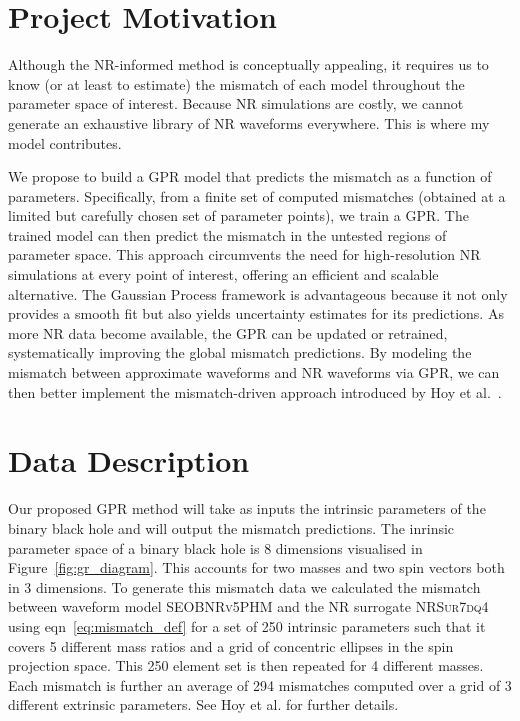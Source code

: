 \documentclass{ucdgradtaughtthesis}
\begin{document}
\section{Project Motivation}
Although the NR-informed method is conceptually appealing, it requires us to know (or at least to estimate) 
the mismatch of each model throughout the parameter space of interest. Because
NR simulations are costly, we cannot generate an exhaustive library of NR waveforms
everywhere. This is where my model contributes.
%

We propose to build a GPR model that predicts the mismatch as a function of parameters. Specifically, from a finite set of computed mismatches (obtained at a limited but carefully chosen set of parameter points), we train a GPR.
The trained model can then predict the mismatch in the untested regions of parameter space. This approach circumvents the need for high-resolution NR simulations at every point of interest,
offering an efficient and scalable alternative. The Gaussian Process framework is advantageous because it not only provides a smooth fit but also yields uncertainty estimates for its predictions.
As more NR data become available, the GPR can be updated or retrained, systematically improving the global mismatch predictions.
By modeling the mismatch between approximate waveforms and NR waveforms via GPR, we can then better implement the mismatch-driven approach introduced by Hoy et al.~\cite{Ogpaper}. 

\section{Data Description}
\label{sec:data_description}
Our proposed GPR method will take as inputs the intrinsic parameters of the binary black hole and will output the mismatch predictions.
The inrinsic parameter space of a binary black hole is 8 dimensions visualised in Figure~\ref{fig:gr_diagram}. This accounts for two masses and two spin vectors both in 3 dimensions. 
To generate this mismatch data we calculated the mismatch between waveform model \textsc{SEOBNRv5PHM} \cite{bestNRfitS} and the NR surrogate \textsc{NRSur7dq4} \cite{NRsurrogate} using eqn~\eqref{eq:mismatch_def} for a set of 250 intrinsic parameters 
such that it covers 5 different mass ratios and a grid of concentric ellipses in the spin projection space.
This 250 element set is then repeated for 4 different masses.
Each mismatch is further an average of 294 mismatches computed over a grid of 3 different extrinsic parameters.
See Hoy et al. for further details.
%
\end{document}

